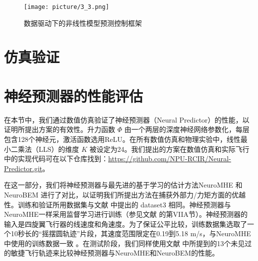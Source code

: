 \documentclass[lang=chs, degree=master, blindreview=false, winfonts=true]{yanputhesis}
\begin{document}
\begin{figure}[hbt!]
	\centering
	\texttt{[image: picture/3\_3.png]} 
	\caption{数据驱动下的非线性模型预测控制框架} \label{illustration_framework}
\end{figure}
\section{仿真验证}

\section{神经预测器的性能评估}

在本节中，我们通过数值仿真验证了神经预测器（Neural Predictor）的性能，以证明所提出方案的有效性。升力函数 $\Phi$ 由一个两层的深度神经网络参数化，每层包含128个神经元，激活函数选用ReLU。在所有数值仿真和物理实验中，线性最小二乘法（LLS）的维度 $K$ 被设定为24。我们提出的方案在数值仿真和实际飞行中的实现代码可在以下仓库找到：\href{https://github.com/NPU-RCIR/Neural-Predictor.git}{https://github.com/NPU-RCIR/Neural-Predictor.git}。

在这一部分，我们将神经预测器与最先进的基于学习的估计方法NeuroMHE \cite{Wang2024e} 和 NeuroBEM \cite{Bauersfeld2021} 进行了对比，以证明我们所提出方法在捕获外部力/力矩方面的优越性。训练和验证所用数据集与文献 \cite{Bauersfeld2021} 中提出的 dataset3 相同。神经预测器与NeuroMHE一样采用监督学习进行训练（参见文献 \cite{Wang2024e} 的第VIIA节）。神经预测器的输入是四旋翼飞行器的线速度和角速度。为了保证公平比较，训练数据集选取了一个10秒长的“摇摆圆轨迹”片段，其速度范围限定在0.19到5.18 m/s，与NeuroMHE中使用的训练数据一致 \cite{Wang2024e}。在测试阶段，我们同样使用文献 \cite{Wang2024e} 中所提到的13个未见过的敏捷飞行轨迹来比较神经预测器与NeuroMHE和NeuroBEM的性能。
\end{document}
